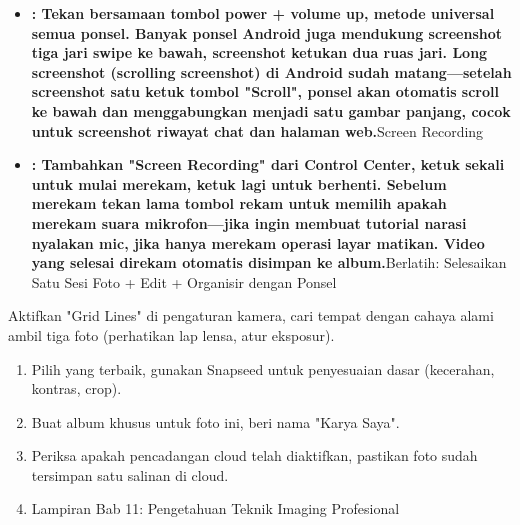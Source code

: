 \begin{itemize}
  \item \textbf{: Tekan bersamaan tombol power + volume up, metode universal semua ponsel. Banyak ponsel Android juga mendukung screenshot tiga jari swipe ke bawah, screenshot ketukan dua ruas jari. Long screenshot (scrolling screenshot) di Android sudah matang—setelah screenshot satu ketuk tombol "Scroll", ponsel akan otomatis scroll ke bawah dan menggabungkan menjadi satu gambar panjang, cocok untuk screenshot riwayat chat dan halaman web.}Screen Recording
  \item \textbf{: Tambahkan "Screen Recording" dari Control Center, ketuk sekali untuk mulai merekam, ketuk lagi untuk berhenti. Sebelum merekam tekan lama tombol rekam untuk memilih apakah merekam suara mikrofon—jika ingin membuat tutorial narasi nyalakan mic, jika hanya merekam operasi layar matikan. Video yang selesai direkam otomatis disimpan ke album.}Berlatih: Selesaikan Satu Sesi Foto + Edit + Organisir dengan Ponsel
\end{itemize}

\begin{tcbpractice}{Aktifkan "Grid Lines" di pengaturan kamera, cari tempat dengan cahaya alami ambil tiga foto (perhatikan lap lensa, atur eksposur).}
\begin{enumerate}
  \item Pilih yang terbaik, gunakan Snapseed untuk penyesuaian dasar (kecerahan, kontras, crop).
  \item Buat album khusus untuk foto ini, beri nama "Karya Saya".
  \item Periksa apakah pencadangan cloud telah diaktifkan, pastikan foto sudah tersimpan satu salinan di cloud.
  \item Lampiran Bab 11: Pengetahuan Teknik Imaging Profesional
\end{enumerate}

\end{tcbpractice}
